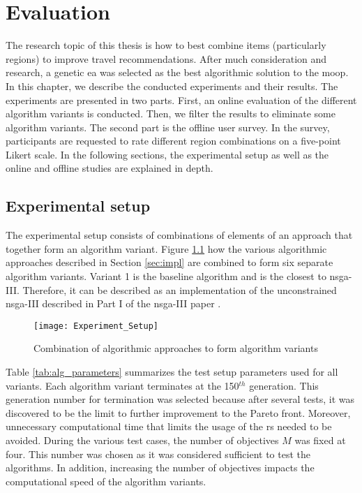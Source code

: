 \chapter{Evaluation}\label{chapter:evaluation}
The research topic of this thesis is how to best combine items (particularly regions) to improve travel recommendations. After much consideration and research, a genetic \gls{ea} was selected as the best algorithmic solution to the \gls{moop}. In this chapter, we describe the conducted experiments and their results. The experiments are presented in two parts. First, an online evaluation of the different algorithm variants is conducted. Then, we filter the results to eliminate some algorithm variants. The second part is the offline user survey. In the survey, participants are requested to rate different region combinations on a five-point Likert scale. In the following sections, the experimental setup as well as the online and offline studies are explained in depth.

\section{Experimental setup}
The experimental setup consists of combinations of elements of an approach that together form an algorithm variant. Figure \ref{fig:experiment_setup} how the various algorithmic approaches described in Section \ref{sec:impl} are combined to form six separate algorithm variants. Variant 1 is the baseline algorithm and is the closest to \gls{nsga}-III. Therefore, it can be described as an implementation of the unconstrained \gls{nsga}-III described in Part I of the \gls{nsga}-III paper \parencite{Deb2006ReferenceAlgorithms}.

\begin{figure}[h!]
    \centering
    \texttt{[image: Experiment\_Setup]}
    \caption{Combination of algorithmic approaches to form algorithm variants}
    \label{fig:experiment_setup}
\end{figure}


Table \ref{tab:alg_parameters} summarizes the test setup parameters used for all variants. Each algorithm variant terminates at the 150$^{th}$ generation. This generation number for termination was selected because after several tests, it was discovered to be the limit to further improvement to the Pareto front. Moreover, unnecessary computational time that limits the usage of the \gls{rs} needed to be avoided. During the various test cases, the number of objectives $M$ was fixed at four. This number was chosen as it was considered sufficient to test the algorithms. In addition, increasing the number of objectives impacts the computational speed of the algorithm variants.

